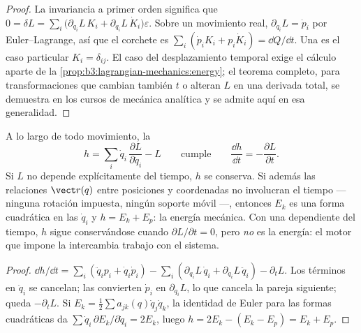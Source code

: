\begin{proof}
La invariancia a primer orden significa que
$0 = \delta L = \sum_i\big(\partial_{q_i}L\,K_i +
\partial_{\dot q_i}L\,\dot K_i\big)\varepsilon$. Sobre un movimiento real,
$\partial_{q_i}L = \dot p_i$ por Euler--Lagrange, así que el corchete es
$\sum_i(\dot p_iK_i + p_i\dot K_i) = \dd Q/\dd t$. Una 
es el caso particular $K_i = \delta_{ij}$. El caso del desplazamiento
temporal exige el cálculo aparte de la
\cref{prop:b3:lagrangian-mechanics:energy}; el teorema completo, para
transformaciones que cambian también $t$ o alteran $L$ en una derivada
total, se demuestra en los cursos de mecánica analítica y se admite aquí en
esa generalidad.
\end{proof}

\begin{proposition}\label{prop:b3:lagrangian-mechanics:energy}
A lo largo de todo movimiento, la \emph{}
\[
h = \sum_i \dot q_i\,\frac{\partial L}{\partial\dot q_i} - L
\qquad\text{cumple}\qquad
\frac{\dd h}{\dd t} = -\frac{\partial L}{\partial t} .
\]
Si $L$ no depende explícitamente del tiempo, $h$ se conserva. Si además las
relaciones $\vect r(q)$ entre posiciones y coordenadas no involucran el
tiempo --- ninguna rotación impuesta, ningún soporte móvil ---, entonces
$E_k$ es una forma cuadrática en las $\dot q_i$ y $h = E_k + E_p$: la
energía mecánica. Con una  dependiente del tiempo, $h$ sigue
conservándose cuando $\partial L/\partial t = 0$, pero \emph{no} es la
energía: el motor que impone la  intercambia trabajo con el sistema.
\end{proposition}

\begin{proof}
$\dd h/\dd t = \sum_i(\ddot q_ip_i + \dot q_i\dot p_i) -
\sum_i(\partial_{q_i}L\,\dot q_i + \partial_{\dot q_i}L\,\ddot q_i) -
\partial_tL$. Los términos en $\ddot q_i$ se cancelan; las  convierten $\dot p_i$ en $\partial_{q_i}L$, lo que cancela
la pareja siguiente; queda $-\partial_tL$. Si $E_k = \tfrac12\sum a_{jk}(q)\dot
q_j\dot q_k$, la identidad de Euler para las formas cuadráticas da $\sum\dot
q_i\,\partial E_k/\partial\dot q_i = 2E_k$, luego $h = 2E_k - (E_k - E_p)
= E_k + E_p$.
\end{proof}

